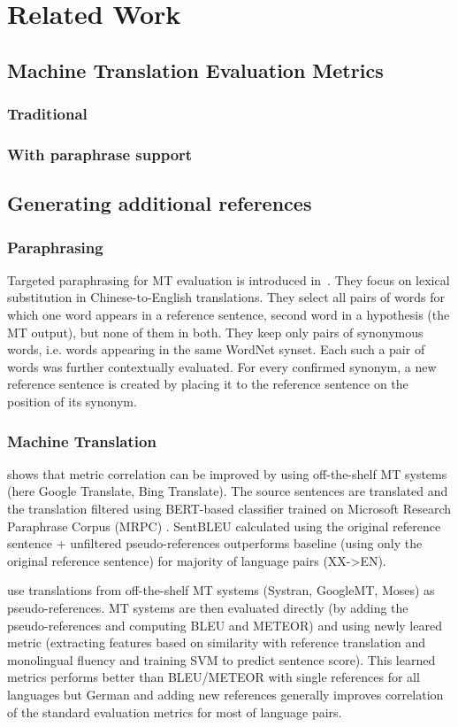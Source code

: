 \chapter{Related Work}


\section{Machine Translation Evaluation Metrics}
\subsection{Traditional}



\subsection{With paraphrase support}




\section{Generating additional references}
\subsection{Paraphrasing}
Targeted paraphrasing for MT evaluation is introduced in~\citet{kauchak}. They 
focus on lexical substitution in Chinese-to-English translations. 
They select all pairs of words for which one word appears in a reference sentence,
second word in a hypothesis (the MT output), but none of them in both. They keep 
only pairs of synonymous words, i.e. words appearing in the same WordNet 
\cite{wordnet} synset. Each such a pair of words was further contextually evaluated. 
For every confirmed synonym, a new reference sentence is created by placing it to the
reference sentence on the position of its synonym.


\subsection{Machine Translation}
\cite{yoshimura_2019a} shows that metric correlation can be improved by using
off-the-shelf MT systems (here Google Translate, Bing Translate). The 
source sentences are translated and the translation filtered using BERT-based classifier
trained on Microsoft Research Paraphrase Corpus (MRPC) \citep{dolan_2005}.  SentBLEU calculated using the original reference sentence + unfiltered 
pseudo-references outperforms baseline (using  only the original reference sentence) 
for majority of language pairs (XX->EN).

\cite{albrecht_2008} use translations from off-the-shelf MT systems (Systran, 
GoogleMT, Moses) as pseudo-references. MT systems are then evaluated directly
(by adding the pseudo-references and computing BLEU and METEOR) and using
newly leared metric (extracting features based on similarity with reference translation
 and monolingual fluency and training SVM to predict sentence score). This learned 
 metrics performs better than BLEU/METEOR with single references for all languages 
but German and adding new references generally improves correlation of the standard
 evaluation metrics for most of language pairs.